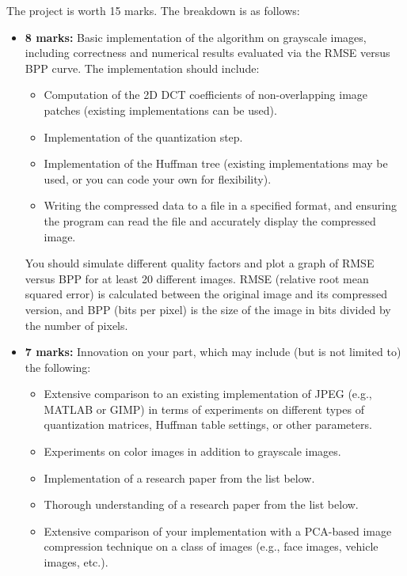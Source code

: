 \documentclass[11pt]{article}
\begin{document}
The project is worth 15 marks. The breakdown is as follows:
\begin{itemize}
    \item \textbf{8 marks:} Basic implementation of the algorithm on grayscale images, including correctness and numerical results evaluated via the RMSE versus BPP curve. The implementation should include:
    \begin{itemize}
        \item Computation of the 2D DCT coefficients of non-overlapping image patches (existing implementations can be used).
        \item Implementation of the quantization step.
        \item Implementation of the Huffman tree (existing implementations may be used, or you can code your own for flexibility).
        \item Writing the compressed data to a file in a specified format, and ensuring the program can read the file and accurately display the compressed image.
    \end{itemize}
    You should simulate different quality factors and plot a graph of RMSE versus BPP for at least 20 different images. RMSE (relative root mean squared error) is calculated between the original image and its compressed version, and BPP (bits per pixel) is the size of the image in bits divided by the number of pixels.
    
    \item \textbf{7 marks:} Innovation on your part, which may include (but is not limited to) the following:
    \begin{itemize}
        \item Extensive comparison to an existing implementation of JPEG (e.g., MATLAB or GIMP) in terms of experiments on different types of quantization matrices, Huffman table settings, or other parameters.
        \item Experiments on color images in addition to grayscale images.
        \item Implementation of a research paper from the list below.
        \item Thorough understanding of a research paper from the list below.
        \item Extensive comparison of your implementation with a PCA-based image compression technique on a class of images (e.g., face images, vehicle images, etc.).
    \end{itemize}
\end{itemize}
\end{document}
